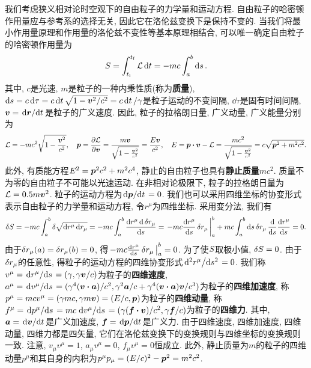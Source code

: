 我们考虑狭义相对论时空观下的自由粒子的力学量和运动方程. 自由粒子的哈密顿作用量应与参考系的选择无关, 因此它在洛伦兹变换下是保持不变的. 当我们将最小作用量原理和作用量的洛伦兹不变性等基本原理相结合, 可以唯一确定自由粒子的哈密顿作用量为
\begin{equation*}
    S = \int_{t_{\mathrm{i}}}^{t_{\mathrm{f}}} \mathcal{L} \dd{t} = -mc \int_a^b \dd{s}.
\end{equation*}
其中, $ c $是光速, $ m $是粒子的一种内秉性质(称为\textbf{质量}), $ \dd{s} = c \dd{\tau} = c\dd{t} \sqrt{1-\vb*{v}^2/c^2} = c \dd{t}/\gamma $是粒子运动的不变间隔, $ \dd{\tau} $是固有时间间隔, $ \vb*{v} = \dv*{\vb*{r}}{t} $是粒子的广义速度. 因此, 粒子的拉格朗日量, 广义动量, 广义能量分别为
\begin{equation*}
    \lagr = -mc^2 \sqrt{1-\frac{\vb*{v}^2}{c^2}}, \quad \vb*{p} = \pdv{\lagr}{\vb*{v}} = \frac{m\vb*{v}}{\sqrt{1-\frac{\vb*{v}^2}{c^2}}} = \frac{E \vb*{v}}{c^2}, \quad E = \vb*{p} \vdot \vb*{v} - \lagr = \frac{mc^2}{\sqrt{1-\frac{\vb*{v}^2}{c^2}}} = c \sqrt{\vb*{p}^2 + m^2 c^2}.
\end{equation*}
此外, 有质能方程$ E^2 = \vb*{p}^2 c^2 + m^2 c^4 $, 静止的自由粒子也具有\textbf{静止质量}$ mc^2 $. 质量不为零的自由粒子不可能以光速运动. 在非相对论极限下, 粒子的拉格朗日量为$ \mathcal{L} = 0.5 m\vb*{v}^2 $. 粒子的运动方程为$ \dv*{\vb*{p}}{t}=0 $. 我们也可以采用四维坐标的协变形式表示自由粒子的力学量和运动方程, 令$ r^{\mu} $为四维坐标. 采用变分法, 我们有
\begin{equation*}
    \var{\action} = -mc \int_a^b \var{\sqrt{\dd{r^{\mu}} \dd{r_{\mu}}}} = -mc \int_a^b \frac{\dd{r^{\mu}} \dd{\var{r_{\mu}}}}{\dd{s}} = \eval{-mc \dv{r^{\mu}}{s} \var{r_{\mu}}}_a^b + mc \int_a^b \dd{s} \var{r_{\mu}} \dv{s} \dv{r^{\mu}}{s} = 0.
\end{equation*}
由于$ \var{r_{\mu}(a)}=\var{r_{\mu}(b)}=0 $, 得$ \eval{-mc \dv{r^{\mu}}{s} \var{r_{\mu}}}_a^b=0 $. 为了使$ S $取极小值, $ \var{S}=0 $. 由于$ \var{r_{\mu}} $的任意性, 得粒子的运动方程的四维协变形式$ \dv*[2]{r^{\mu}}{s} = 0 $. 我们称$ v^{\mu}=\dv*{r^{\mu}}{s}=(\gamma,\gamma \vb*{v}/c) $为粒子的\textbf{四维速度}, $ a^{\mu}=\dv*{v^{\mu}}{s}=(\gamma^4 (\vb*{v} \vdot \vb*{a})/c^2,\gamma^2\vb*{a}/c + \gamma^4 (\vb*{v} \vdot \vb*{a}) \vb*{v}/c^3) $为粒子的\textbf{四维加速度}, 称$ p^{\mu} = mcv^{\mu}= (\gamma mc, \gamma m \vb*{v}) = (E/c,\vb*{p}) $为粒子的\textbf{四维动量}, 称$ f^{\mu}=\dv*{p^{\mu}}{s}=mc\dv*{v^{\mu}}{s}=(\gamma (\vb*{f} \vdot \vb*{v})/c^2,\gamma\vb*{f}/c) $为粒子的\textbf{四维力}. 其中, $ \vb*{a}=\dv*{\vb*{v}}{t} $是广义加速度, $ \vb*{f}=\dv*{\vb*{p}}{t} $是广义力. 由于四维速度, 四维加速度, 四维动量, 四维力都是四矢量, 它们在洛伦兹变换下的变换规则与四维坐标的变换规则一致. 注意, $ v_{\mu} v^{\mu}=1 $, $ a_{\mu} v^{\mu}=0 $, $ f_{\mu} v^{\mu} = 0 $恒成立. 此外, 静止质量为$ m $的粒子的四维动量$ p^{\mu} $和其自身的内积为$ p^{\mu} p_{\mu} = (E/c)^2 - \vb*{p}^2 = m^2 c^2 $.

